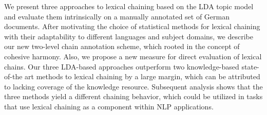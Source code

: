 We present three approaches to lexical chaining based on the LDA topic model and evaluate them intrinsically on a manually annotated set of German
 documents. After motivating the choice of statistical methods for lexical
 chaining with their adaptability to different languages and subject domains, we
 describe our new two-level chain annotation scheme, which rooted in the concept
 of cohesive harmony. Also, we propose a new measure for direct evaluation of
 lexical chains. Our three LDA-based approaches outperform two
 knowledge-based state-of-the art methods to lexical chaining by a large margin,
 which can be attributed to lacking coverage of the knowledge resource.
 Subsequent analysis shows that the three methods yield a different chaining
 behavior, which could be utilized in tasks that use lexical chaining as a
 component within NLP
 applications.

